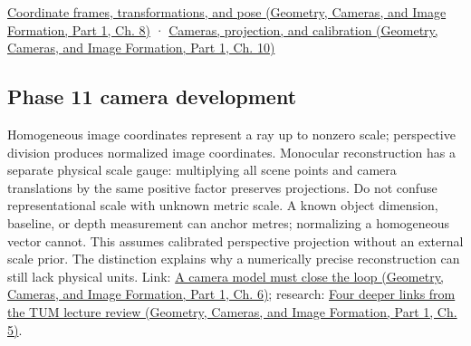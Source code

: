 \href{../03-Geometry-Cameras-and-Image-Formation-P01/main.pdf\#nameddest=03-visual-computing-i-ch001-coordinate-frames-transformations-and-pose}{Coordinate frames, transformations, and pose (Geometry, Cameras, and Image Formation, Part 1, Ch. 8)} · \href{../03-Geometry-Cameras-and-Image-Formation-P01/main.pdf\#nameddest=03-visual-computing-i-ch003-cameras-projection-and-calibration}{Cameras, projection, and calibration (Geometry, Cameras, and Image Formation, Part 1, Ch. 10)}

\subsection{Phase 11 camera development}\label{appendix-cb3b26862282-phase-11-camera-development}

\hypertarget{appendix-cb3b26862282-phase-11-camera-development}{}

Homogeneous image coordinates represent a ray up to nonzero scale; perspective division produces normalized image coordinates. Monocular reconstruction has a separate physical scale gauge: multiplying all scene points and camera translations by the same positive factor preserves projections. Do not confuse representational scale with unknown metric scale. A known object dimension, baseline, or depth measurement can anchor metres; normalizing a homogeneous vector cannot. This assumes calibrated perspective projection without an external scale prior. The distinction explains why a numerically precise reconstruction can still lack physical units. Link: \href{../03-Geometry-Cameras-and-Image-Formation-P01/main.pdf\#nameddest=02-foundations-ii-ch037-a-camera-model-must-close-the-loop}{A camera model must close the loop (Geometry, Cameras, and Image Formation, Part 1, Ch. 6)}; research: \href{../03-Geometry-Cameras-and-Image-Formation-P01/main.pdf\#nameddest=02-foundations-ii-ch036-four-deeper-links-from-the-tum-lecture-review}{Four deeper links from the TUM lecture review (Geometry, Cameras, and Image Formation, Part 1, Ch. 5)}.
